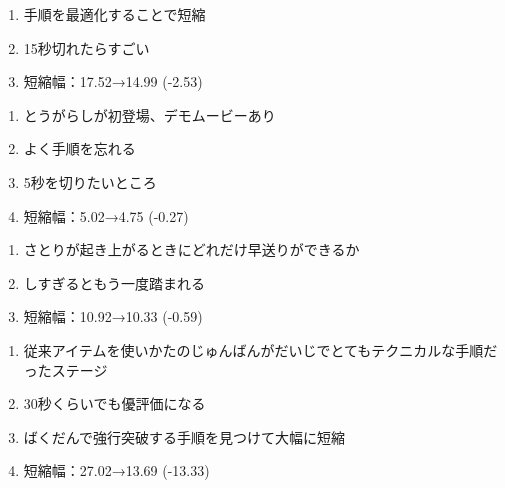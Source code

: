 \begin{enumerate}[label={\sarrow}]
\item 手順を最適化することで短縮
\item 15秒切れたらすごい
\item 短縮幅：17.52→14.99 (-2.53)
\end{enumerate}



\clearpage
\begin{enumerate}[label={\sarrow}]
\item とうがらしが初登場、デモムービーあり
\item よく手順を忘れる
\item 5秒を切りたいところ
\item 短縮幅：5.02→4.75 (-0.27)
\end{enumerate}



\begin{enumerate}[label={\sarrow}]
\item さとりが起き上がるときにどれだけ早送りができるか
\item しすぎるともう一度踏まれる
\item 短縮幅：10.92→10.33 (-0.59)
\end{enumerate}



\begin{enumerate}[label={\sarrow}]
\item 従来アイテムを使いかたのじゅんばんがだいじでとてもテクニカルな手順だったステージ
\item 30秒くらいでも優評価になる
\item ばくだんで強行突破する手順を見つけて大幅に短縮
\item 短縮幅：27.02→13.69 (-13.33)
\end{enumerate}



